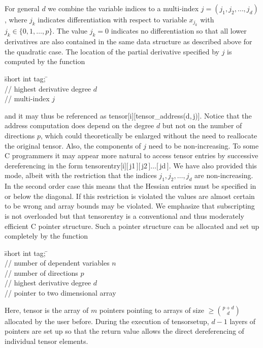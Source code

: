 \documentclass[11pt,twoside]{article}
\begin{document}
For general $d$ we combine the variable
indices to a multi-index $j = (j_1,j_2,\ldots,j_d)$, 
where $j_k$ indicates differentiation with respect to variable 
$x_{j_k}$ with $j_k \in \{0,1,\ldots,p\}$. The value $j_k=0$ indicates
no differentiation so that all lower derivatives are also 
contained in the same data structure as described above for 
the quadratic case. The location of the partial derivative specified 
by $j$ is computed by the function
%
\begin{tabbing}
\hspace{0.5in}\={\sf short int tag;} \hspace{1.1in}\= \kill    %
 \\
                 \> // highest derivative degree $d$ \\
              \> // multi-index $j$
\end{tabbing}       
%
and it may thus be referenced as {\sf tensor[i][tensor\_address(d,$\,$j)]}.
Notice that the address computation does depend on the degree $d$ 
but not on the number of directions $p$, which could theoretically be
enlarged without the need to reallocate the original tensor. 
Also, the components of $j$ need to be non-increasing. 
% 
To some C programmers it may appear more natural to access tensor
entries by successive dereferencing in the form
{\sf tensorentry[i][$\,$j1$\,$][$\,$j2$\,$]$\ldots$[$\,$jd$\,$]}.
We have also provided this mode, albeit with the restriction 
that the indices $j_1,j_2,\ldots,j_d$ are non-increasing.
In the second order case this means that the Hessian entries must be
specified in or below the diagonal. If this restriction is 
violated the values are almost certain to be wrong and array bounds
may be violated. We emphasize that subscripting is not overloaded
but that {\sf tensorentry} is a conventional and 
thus moderately efficient C pointer structure. 
Such a pointer structure can be allocated and set up completely by the 
function
%
\begin{tabbing}
\hspace{0.5in}\={\sf short int tag;} \hspace{1.1in}\= \kill    %
 \\
                 \> // number of dependent variables $n$ \\
                 \> // number of directions $p$\\
                 \> // highest derivative degree $d$\\
\> // pointer to two dimensional array
\end{tabbing}      
%
Here, {\sf tensor} is the array of $m$ pointers pointing to arrays of {\sf size}
$\geq \binom{p+d}{d}$ allocated by the user before. During the execution of {\sf tensorsetup},
 $d-1$ layers of pointers are set up so that the return value 
allows the direct dereferencing of individual tensor elements.
\end{document}
